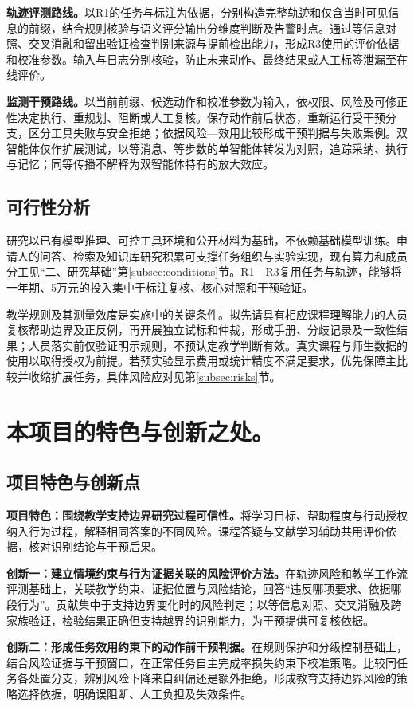 \textbf{轨迹评测路线。}以R1的任务与标注为依据，分别构造完整轨迹和仅含当时可见信息的前缀，结合规则核验与语义评分输出分维度判断及告警时点。通过等信息对照、交叉消融和留出验证检查判别来源与提前检出能力，形成R3使用的评价依据和校准参数。输入与日志分别核验，防止未来动作、最终结果或人工标签泄漏至在线评价。

\textbf{监测干预路线。}以当前前缀、候选动作和校准参数为输入，依权限、风险及可修正性决定执行、重规划、阻断或人工复核。保存动作前后状态，重新运行受干预分支，区分工具失败与安全拒绝；依据风险—效用比较形成干预判据与失败案例。双智能体仅作扩展测试，以等消息、等步数的单智能体转发为对照，追踪采纳、执行与记忆；同等传播不解释为双智能体特有的放大效应。

\subsection{可行性分析}
研究以已有模型推理、可控工具环境和公开材料为基础，不依赖基础模型训练。申请人的问答、检索及知识库研究积累可支撑任务组织与实验实现，现有算力和成员分工见“二、研究基础”第\ref{subsec:conditions}节。R1—R3复用任务与轨迹，能够将一年期、5万元的投入集中于标注复核、核心对照和干预验证。

教学规则及其测量效度是实施中的关键条件。拟先请具有相应课程理解能力的人员复核帮助边界及正反例，再开展独立试标和仲裁，形成手册、分歧记录及一致性结果；人员落实前仅验证明示规则，不预认定教学判断有效。真实课程与师生数据的使用以取得授权为前提。若预实验显示费用或统计精度不满足要求，优先保障主比较并收缩扩展任务，具体风险应对见第\ref{subsec:risks}节。
\section{本项目的特色与创新之处。}
\subsection{项目特色与创新点}
\textbf{项目特色：围绕教学支持边界研究过程可信性。}将学习目标、帮助程度与行动授权纳入行为过程，解释相同答案的不同风险。课程答疑与文献学习辅助共用评价依据，核对识别结论与干预后果。

\textbf{创新一：建立情境约束与行为证据关联的风险评价方法。}在轨迹风险和教学工作流评测基础上\cite{yuan2024rjudge,teacharena2026}，关联教学约束、证据位置与风险结论，回答“违反哪项要求、依据哪段行为”。贡献集中于支持边界变化时的风险判定；以等信息对照、交叉消融及跨家族验证，检验结果正确但支持越界的识别能力，为干预提供可复核依据。

\textbf{创新二：形成任务效用约束下的动作前干预判据。}在规则保护和分级控制基础上\cite{xiang2024guardagent,agentguard2026nexus}，结合风险证据与干预窗口，在正常任务自主完成率损失约束下校准策略。比较同任务各处置分支，辨别风险下降来自纠偏还是额外拒绝，形成教育支持边界风险的策略选择依据，明确误阻断、人工负担及失效条件。

